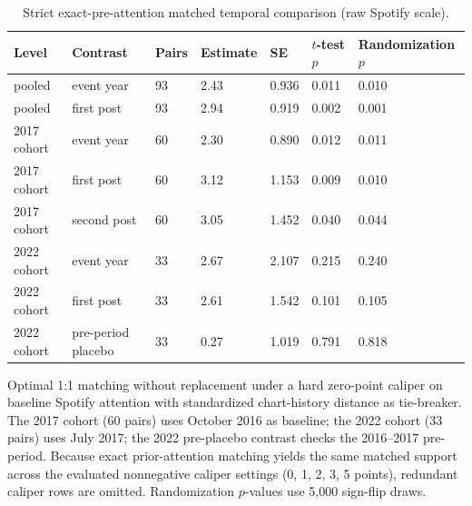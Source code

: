 \begin{table}[!htbp]
\centering
\footnotesize
\caption{Strict exact-pre-attention matched temporal comparison (raw Spotify scale).}
\label{tab:si-strict-temporal}
\renewcommand{\arraystretch}{1.05}
\begin{tabular}{lllllll}
\toprule
Level & Contrast & Pairs & Estimate & SE & $t$-test $p$ & Randomization $p$ \\
\midrule
pooled & event year & 93 & 2.43 & 0.936 & 0.011 & 0.010 \\
pooled & first post & 93 & 2.94 & 0.919 & 0.002 & 0.001 \\
2017 cohort & event year & 60 & 2.30 & 0.890 & 0.012 & 0.011 \\
2017 cohort & first post & 60 & 3.12 & 1.153 & 0.009 & 0.010 \\
2017 cohort & second post & 60 & 3.05 & 1.452 & 0.040 & 0.044 \\
2022 cohort & event year & 33 & 2.67 & 2.107 & 0.215 & 0.240 \\
2022 cohort & first post & 33 & 2.61 & 1.542 & 0.101 & 0.105 \\
2022 cohort & pre-period placebo & 33 & 0.27 & 1.019 & 0.791 & 0.818 \\
\bottomrule
\end{tabular}
\begin{flushleft}\footnotesize
Optimal 1:1 matching without replacement under a hard zero-point caliper on baseline Spotify attention with standardized chart-history distance as tie-breaker. The 2017 cohort (60 pairs) uses October 2016 as baseline; the 2022 cohort (33 pairs) uses July 2017; the 2022 pre-placebo contrast checks the 2016--2017 pre-period. Because exact prior-attention matching yields the same matched support across the evaluated nonnegative caliper settings (0, 1, 2, 3, 5 points), redundant caliper rows are omitted. Randomization $p$-values use 5{,}000 sign-flip draws.
\end{flushleft}
\end{table}
